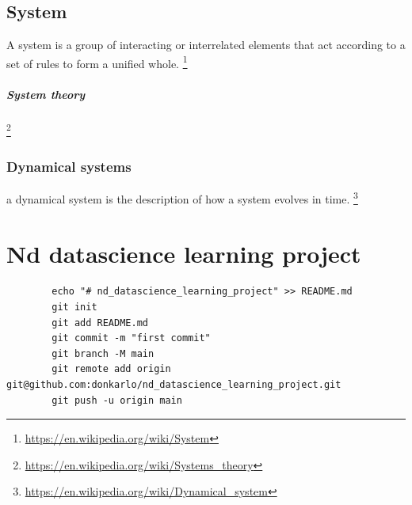 \documentclass{book}
\providecommand{\seeherefooter}[1]{\footnote{\url{#1}}}
\begin{document}
\section{System}


A system is a group of interacting or interrelated elements that act according to a set of rules to form a unified whole. \seeherefooter{https://en.wikipedia.org/wiki/System}
    \paragraph{System theory}
    \seeherefooter{https://en.wikipedia.org/wiki/Systems_theory}
    

\subsection{Dynamical systems}


a dynamical system is the description of how a system evolves in time.
    \seeherefooter{https://en.wikipedia.org/wiki/Dynamical_system}
    

\chapter{Nd datascience learning project}


\begin{verbatim}
        echo "# nd_datascience_learning_project" >> README.md
        git init
        git add README.md
        git commit -m "first commit"
        git branch -M main
        git remote add origin git@github.com:donkarlo/nd_datascience_learning_project.git
        git push -u origin main
    \end{verbatim}


\tableofcontents


\cite{settles-2009-active-learning-literature-survey}
\listoftodos

\end{document}
